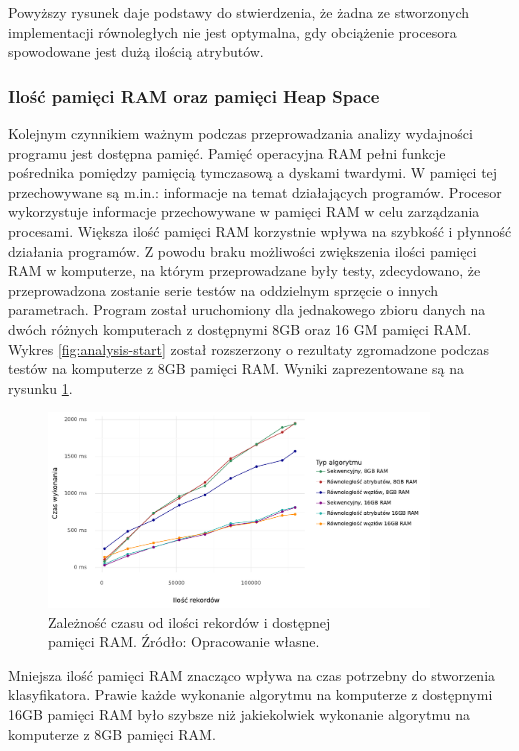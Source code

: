 \documentclass[12pt]{article}
\begin{document}
Powyższy rysunek daje podstawy do stwierdzenia, że żadna ze stworzonych implementacji równoległych nie jest optymalna,
gdy obciążenie procesora spowodowane jest dużą ilością atrybutów.

\subsubsection{Ilość pamięci RAM oraz pamięci Heap Space}

Kolejnym czynnikiem ważnym podczas przeprowadzania analizy wydajności programu jest dostępna pamięć.
Pamięć operacyjna RAM pełni funkcje pośrednika pomiędzy pamięcią tymczasową a dyskami twardymi.
W pamięci tej przechowywane są m.in.: informacje na temat działających programów. Procesor wykorzystuje informacje
przechowywane w pamięci RAM w celu zarządzania procesami.
Większa ilość pamięci RAM korzystnie wpływa na szybkość i płynność działania programów. 
Z powodu braku możliwości zwiększenia ilości pamięci RAM w komputerze, na którym przeprowadzane były testy, zdecydowano, że
przeprowadzona zostanie serie testów na oddzielnym sprzęcie o innych parametrach. Program został uruchomiony
dla jednakowego zbioru danych na dwóch różnych komputerach z dostępnymi 8GB oraz 16 GM pamięci RAM.
Wykres \ref{fig:analysis-start} został rozszerzony o rezultaty zgromadzone podczas testów na komputerze z 8GB pamięci RAM.
Wyniki zaprezentowane są na rysunku \ref{fig:analysis-ram}.

\begin{figure}[H]
    \centering
	\includegraphics[width=0.9\textwidth]{analysis-ram.pdf}
    \caption{Zależność czasu od ilości rekordów i dostępnej\\pamięci RAM. Źródło: Opracowanie własne.}
    \label{fig:analysis-ram}
\end{figure}

Mniejsza ilość pamięci RAM znacząco wpływa na czas potrzebny do stworzenia klasyfikatora.
Prawie każde wykonanie algorytmu na komputerze z dostępnymi 16GB pamięci RAM było szybsze niż
jakiekolwiek wykonanie algorytmu na komputerze z 8GB pamięci RAM.
\end{document}
